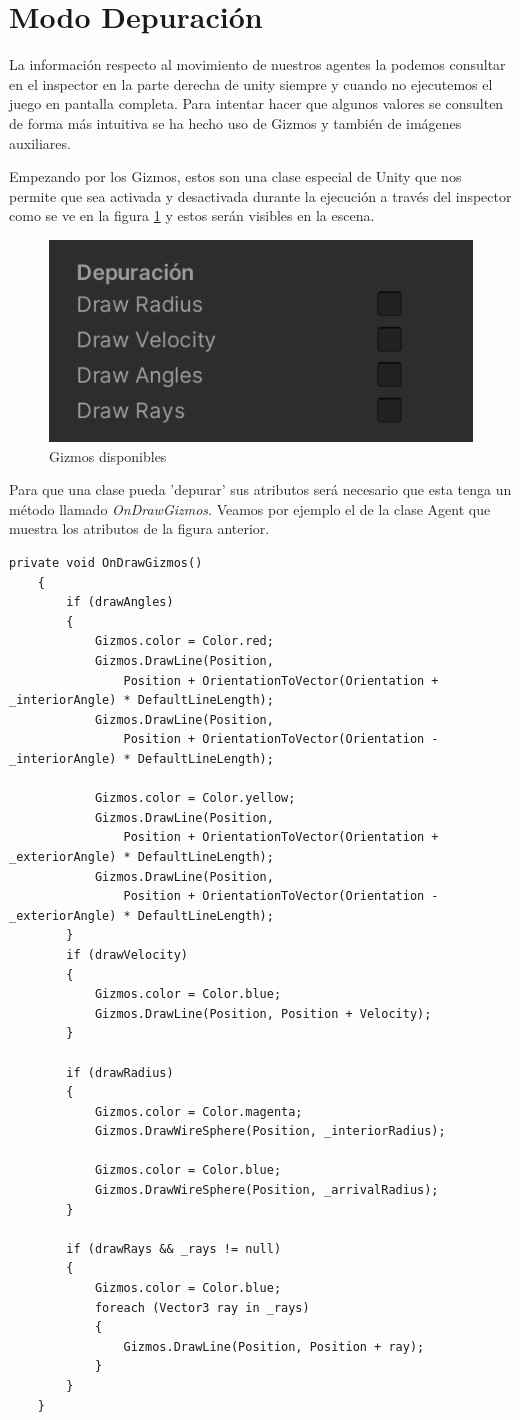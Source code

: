 
\section{Modo Depuración}
La información respecto al movimiento de nuestros agentes la podemos consultar en el inspector en la parte derecha de unity siempre y cuando no ejecutemos el juego en pantalla completa. Para intentar hacer que algunos valores se consulten de forma más intuitiva se ha hecho uso de Gizmos y también de imágenes auxiliares.

Empezando por los Gizmos, estos son una clase especial de Unity que nos permite que sea activada y desactivada durante la ejecución a través del inspector como se ve en la figura \ref{fig:giz} y estos serán visibles en la escena.
\begin{figure}[H]
    \centering
    \includegraphics[scale=0.5]{doc/images/Gizmos.png}
    \caption{Gizmos disponibles}
    \label{fig:giz}
\end{figure}

Para que una clase pueda 'depurar' sus atributos será necesario que esta tenga un método llamado \textit{OnDrawGizmos}. Veamos por ejemplo el de la clase Agent que muestra los atributos de la figura anterior. 
\begin{lstlisting}
private void OnDrawGizmos()
	{
		if (drawAngles)
		{
			Gizmos.color = Color.red;
			Gizmos.DrawLine(Position,
				Position + OrientationToVector(Orientation + _interiorAngle) * DefaultLineLength);
			Gizmos.DrawLine(Position,
				Position + OrientationToVector(Orientation - _interiorAngle) * DefaultLineLength);
			
			Gizmos.color = Color.yellow;
			Gizmos.DrawLine(Position,
				Position + OrientationToVector(Orientation + _exteriorAngle) * DefaultLineLength);
			Gizmos.DrawLine(Position,
				Position + OrientationToVector(Orientation - _exteriorAngle) * DefaultLineLength);
		}
		if (drawVelocity)
		{
			Gizmos.color = Color.blue;
			Gizmos.DrawLine(Position, Position + Velocity);
		}

		if (drawRadius)
		{
			Gizmos.color = Color.magenta;
			Gizmos.DrawWireSphere(Position, _interiorRadius);
			
			Gizmos.color = Color.blue;
			Gizmos.DrawWireSphere(Position, _arrivalRadius);
		}

		if (drawRays && _rays != null)
		{
			Gizmos.color = Color.blue;
			foreach (Vector3 ray in _rays)
			{
				Gizmos.DrawLine(Position, Position + ray);
			}
		}
	}
\end{lstlisting}

